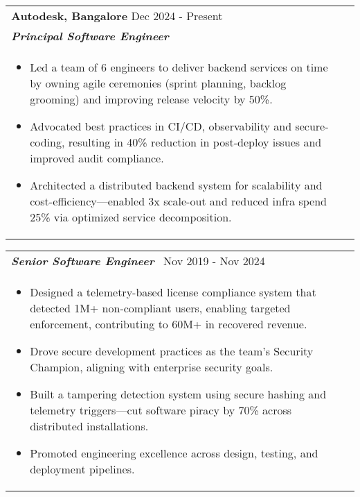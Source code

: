 \documentclass[a4paper,10pt]{article}
\begin{document}
\begin{tabularx}{\linewidth}{ @{}l r@{} }
\textbf{{Autodesk, Bangalore}} \hfill \color[HTML]{371e77} Dec 2024 - Present \\[4pt]
\color[HTML]{371e77}\textbf{\textit{Principal Software Engineer}}\ \hfill \color[HTML]{4B28A4} \\[5pt]
\begin{minipage}[t]{\linewidth}
    \begin{itemize}[nosep,after=\strut, leftmargin=2em, itemsep=2pt]
        \item Led a team of 6 engineers to deliver backend services on time by owning agile ceremonies (sprint planning, backlog grooming) and improving release velocity by 50\%.
        \item Advocated best practices in CI/CD, observability and secure-coding, resulting in 40\% reduction in post-deploy issues and improved audit compliance.
        \item Architected a distributed backend system for scalability and cost-efficiency—enabled 3x scale-out and reduced infra spend 25\% via optimized service decomposition.

    \end{itemize}
\end{minipage}
\end{tabularx}

\begin{tabularx}{\linewidth}{ @{}l r@{} }
\color[HTML]{371e77}\textbf{\textit{Senior Software Engineer}}\ \hfill \color[HTML]{4B28A4} Nov 2019 - Nov 2024\\[5pt]
\begin{minipage}[t]{\linewidth}
    \begin{itemize}[nosep,after=\strut, leftmargin=2em, itemsep=2pt]
        \item Designed a telemetry-based license compliance system that detected 1M+ non-compliant users, enabling targeted enforcement, contributing to 60M+ in recovered revenue.
        \item Drove secure development practices as the team's Security Champion, aligning with enterprise security goals.
        \item Built a tampering detection system using secure hashing and telemetry triggers—cut software piracy by 70\% across distributed installations.
        \item Promoted engineering excellence across design, testing, and deployment pipelines.
    \end{itemize}
\end{minipage}
\end{tabularx}
\end{document}
